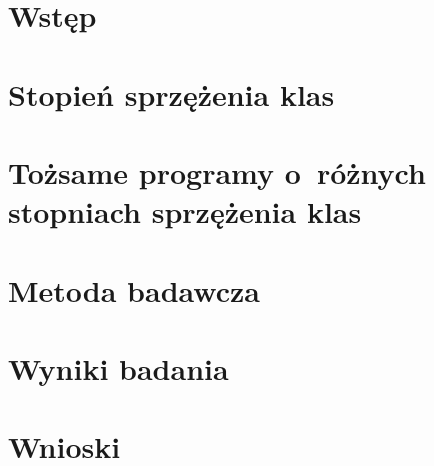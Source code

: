 \chapter{Wstęp}\label{cha:wstep}



\chapter{Stopień sprzężenia klas}\label{cha:coupling}



\chapter{Tożsame programy o~różnych stopniach sprzężenia klas}\label{cha:code}



\chapter{Metoda badawcza}
\label{cha:metoda}



\chapter{Wyniki badania}
\label{cha:wyniki}



\chapter{Wnioski}
\label{cha:wnioski}


